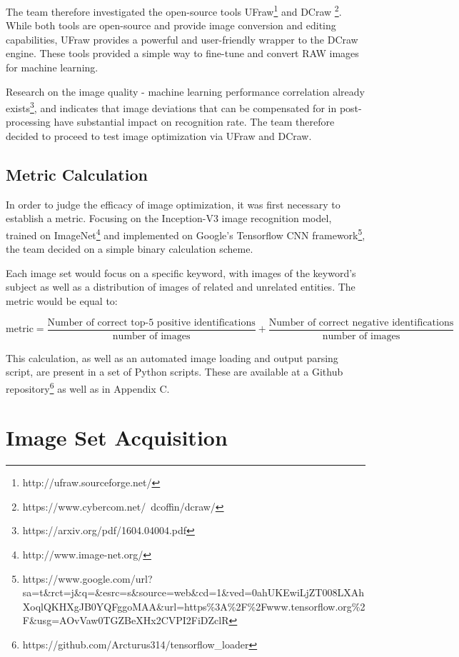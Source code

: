 \documentclass{report}
\begin{document}
		The team therefore investigated the open-source tools UFraw\footnote{http://ufraw.sourceforge.net/} and DCraw \footnote{https://www.cybercom.net/~dcoffin/dcraw/}. While both tools are open-source and provide image conversion and editing capabilities, UFraw provides a powerful and user-friendly wrapper to the DCraw engine. These tools provided a simple way to fine-tune and convert RAW images for machine learning. 
		
		Research on the image quality - machine learning performance correlation already exists\footnote{https://arxiv.org/pdf/1604.04004.pdf}, and indicates that image deviations that can be compensated for in post-processing have substantial impact on recognition rate. The team therefore decided to proceed to test image optimization via UFraw and DCraw.
		\subsection{Metric Calculation}
		In order to judge the efficacy of image optimization, it was first necessary to establish a metric. Focusing on the Inception-V3 image recognition model, trained on ImageNet\footnote{http://www.image-net.org/} and implemented on Google's Tensorflow CNN framework\footnote{https://www.google.com/url?sa=t\&rct=j\&q=\&esrc=s\&source=web\&cd=1\&ved=0ahUKEwiLjZT008LXAhXoqlQKHXgJB0YQFggoMAA\&url=https\%3A\%2F\%2Fwww.tensorflow.org\%2F\&usg=AOvVaw0TGZBeXHx2CVPI2FiDZclR}, the team decided on a simple binary calculation scheme.
		
		Each image set would focus on a specific keyword, with images of the keyword's subject as well as a distribution of images of related and unrelated entities. The metric would be equal to:
		
		\footnotesize
		\begin{equation*}
			\text{metric}=\frac{\text{Number of correct top-5 positive identifications}}{\text{number of images}} + \frac{\text{Number of correct negative identifications}}{\text{number of images}}
		\end{equation*}
		\normalsize
		
		This calculation, as well as an automated image loading and output parsing script, are present in a set of Python scripts. These are available at a Github repository\footnote{https://github.com/Arcturus314/tensorflow\_loader} as well as in Appendix C.
	\section{Image Set Acquisition}
\end{document}
